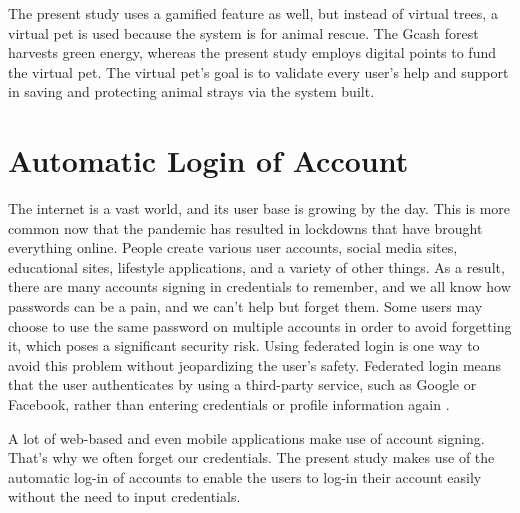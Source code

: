 The present study uses a gamified feature as well, but instead of virtual
trees, a virtual pet is used because the system is for animal rescue. The
Gcash forest harvests green energy, whereas the present study employs digital
points to fund the virtual pet. The virtual pet’s goal is to validate every user’s
help and support in saving and protecting animal strays via the system built.

\section{Automatic Login of Account}

The internet is a vast world, and its user base is growing by the day. This
is more common now that the pandemic has resulted in lockdowns that have
brought everything online. People create various user accounts, social media sites,
educational sites, lifestyle applications, and a variety of other things. As a result,
there are many accounts signing in credentials to remember, and we all know how
passwords can be a pain, and we can’t help but forget them. Some users may
choose to use the same password on multiple accounts in order to avoid forgetting
it, which poses a significant security risk. Using federated login is one way to avoid
this problem without jeopardizing the user’s safety. Federated login means that
the user authenticates by using a third-party service, such as Google or Facebook,
rather than entering credentials or profile information again \cite{google00integrating}.

A lot of web-based and even mobile applications make use of account signing.
That’s why we often forget our credentials. The present study makes use of
the automatic log-in of accounts to enable the users to log-in their account easily
without the need to input credentials.






